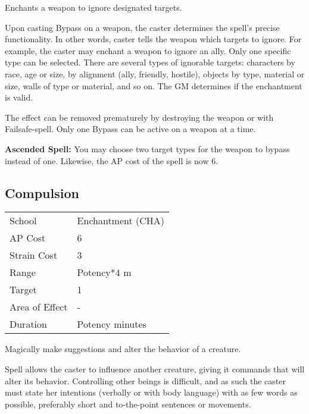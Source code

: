 \documentclass[11pt,a4paper,twocolumn]{book}
\begin{document}
\medskip

Enchants a weapon to ignore designated targets.

Upon casting Bypass on a weapon, the caster determines the spell's precise functionality. In other words, caster tells the weapon which targets to ignore. For example, the caster may enchant a weapon to ignore an ally. Only one specific type can be selected. There are several types of ignorable targets: characters by race, age or size, by alignment (ally, friendly, hostile), objects by type, material or size, walls of type or material, and so on. The GM determines if the enchantment is valid.

The effect can be removed prematurely by destroying the weapon or with Failsafe-spell. Only one Bypass can be active on a weapon at a time.

\medskip

\textbf{Ascended Spell:} You may choose two target types for the weapon to bypass instead of one. Likewise, the AP cost of the spell is now 6.


\subsection*{Compulsion}
{
	\begin{tabu} to 75mm{| X[l,4] | X[l,7] |}
		\hline
		School 			& Enchantment (CHA) 	\\
		AP Cost	      	& 6 					\\
		Strain Cost     & 3 					\\
		Range     		& Potency*4	m			\\
		Target      	& 1 					\\
		Area of Effect  & - 	 				\\
		Duration     	& Potency minutes 		\\ \hline
	\end{tabu}
	
}

\medskip

Magically make suggestions and alter the behavior of a creature.

Spell allows the caster to influence another creature, giving it commands that will alter its behavior. Controlling other beings is difficult, and as such the caster must state her intentions (verbally or with body language) with as few words as possible, preferably short and to-the-point sentences or movements.
\end{document}
